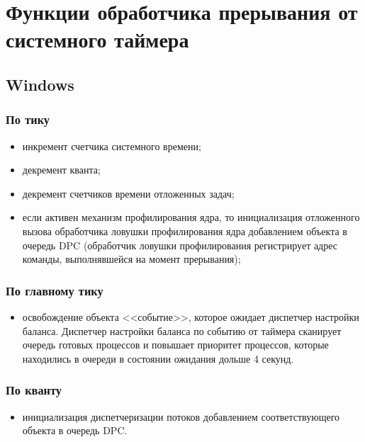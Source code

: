\documentclass[a4paper,oneside,14pt]{extarticle}
\begin{document}

\setcounter{page}{2}
\renewcommand{\contentsname}{СОДЕРЖАНИЕ}
\tableofcontents

\newpage

\section{Функции обработчика прерывания от системного таймера}

\subsection{Windows}

\subsubsection*{По тику}
\begin{itemize}
	\item инкремент счетчика системного времени;
	\item декремент кванта;
	\item декремент счетчиков времени отложенных задач;
    \item если активен механизм профилирования ядра, то инициализация отложенного вызова обработчика ловушки профилирования ядра добавлением объекта в очередь DPC (обработчик ловушки профилирования регистрирует адрес команды, выполнявшейся на момент прерывания);
\end{itemize}

\subsubsection*{По главному тику}
\begin{itemize}
    \item освобождение объекта <<событие>>, которое ожидает диспетчер настройки баланса. Диспетчер настройки баланса по событию от таймера сканирует очередь готовых процессов и повышает приоритет процессов, которые находились в очереди в состоянии ожидания дольше 4 секунд.
\end{itemize}

\subsubsection*{По кванту}
\begin{itemize}
    \item инициализация диспетчеризации потоков добавлением соответствующего объекта в очередь DPC.
\end{itemize}
\end{document}
